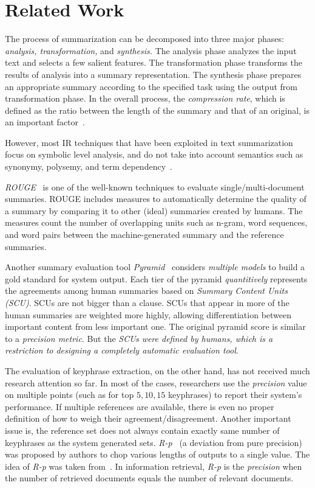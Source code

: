 \documentclass[a4paper]{report}
\begin{document}
\section{Related Work}
\par The process of summarization can be decomposed into three major phases: \emph{analysis, transformation,} and \emph{synthesis.} The analysis phase analyzes the input text and selects a few salient features. The transformation phase transforms the results of analysis into a summary representation. The synthesis phase prepares an appropriate summary according to the specified task using the output from transformation phase. In the overall process, the \emph{compression rate}, which is defined as the ratio between the length of the summary and that of an original, is an important factor~\cite{Yeh:2005:TSU:1041178.1041184}. \\

{\color{blue} \par However, most IR techniques that have been exploited in text summarization focus on symbolic level analysis, and do not take into account semantics such as synonymy, polysemy, and term dependency~\cite{Hovy:1998:ATS:1119089.1119121}.}

\emph{ROUGE}~\cite{Lin04rouge:a} is one of the well-known techniques to evaluate single/multi-document summaries. ROUGE includes measures to automatically determine the quality of a summary by comparing it to other (ideal) summaries created by humans. The measures count the number of overlapping units such as n-gram, word sequences, and word pairs between the machine-generated summary and the reference summaries.
\par Another summary evaluation tool \emph{Pyramid}~\cite{Nenkova:2007:PMI:1233912.1233913} considers \emph{multiple models} to build a gold standard for system output. Each tier of the pyramid \emph{quantitively} represents the agreements among human summaries based on \emph{Summary Content Units (SCU)}. SCUs are not bigger than a clause. SCUs that appear in more of the human summaries are weighted more highly, allowing differentiation between important content from less important one. The original pyramid score is similar to a \emph{precision metric}. But the \emph{SCUs were defined by humans, which is a restriction to designing a completely automatic evaluation tool}.
\par The evaluation of keyphrase extraction, on the other hand, has not received much research attention so far. In most of the cases, researchers use the \emph{precision} value on multiple points (such as for top $5, 10, 15$ keyphrases) to report their system's performance. If multiple references are available, there is even no proper definition of how to weigh their agreement/disagreement. Another important issue is, the reference set does not always contain exactly same number of keyphrases as the system generated sets. \emph{R-p}~\cite{DBLP:conf/ranlp/ZeschG09} (a deviation from pure precision) was proposed by authors to chop various lengths of outputs to a single value. The idea of \emph{R-p} was taken from~\cite{Salton:1986:IMI:576628}. In information retrieval, \emph{R-p} is the \emph{precision} when the number of retrieved documents equals the number of relevant documents. 
\end{document}
